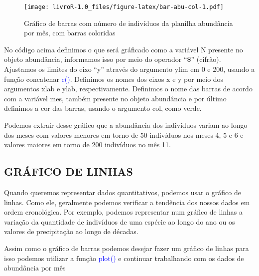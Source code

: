 \documentclass[titlepage, oneside, openany, a4paper]{book}
\newenvironment{Shaded}{\begin{snugshade}}{\end{snugshade}}
\newcommand{\DataTypeTok}[1]{\textcolor[rgb]{0.13,0.29,0.53}{#1}}
\newcommand{\DecValTok}[1]{\textcolor[rgb]{0.00,0.00,0.81}{#1}}
\newcommand{\KeywordTok}[1]{\textcolor[rgb]{0.13,0.29,0.53}{\textbf{#1}}}
\newcommand{\NormalTok}[1]{#1}
\newcommand{\OperatorTok}[1]{\textcolor[rgb]{0.81,0.36,0.00}{\textbf{#1}}}
\newcommand{\StringTok}[1]{\textcolor[rgb]{0.31,0.60,0.02}{#1}}
\begin{document}
\begin{Shaded}
\end{Shaded}

\begin{figure}
\centering
\texttt{[image: livroR-1.0\_files/figure-latex/bar-abu-col-1.pdf]}
\caption{\label{fig:bar-abu-col}Gráfico de barras com número de indivíduos da planilha abundância por mês, com barras coloridas}
\end{figure}

No código acima definimos o que será gráficado como a variável N presente no objeto abundância, informamos isso por meio do operador ``\textbf{\$}'' (cifrão). Ajustamos os limites do eixo ``y'' através do argumento ylim em 0 e 200, usando a função concatenar \textcolor{blue}{c()}. Definimos os nomes dos eixos x e y por meio dos argumentos xlab e ylab, respectivamente. Definimos o nome das barras de acordo com a variável mes, também presente no objeto abundância e por último definimos a cor das barras, usando o argumento col, como verde.

Podemos extrair desse gráfico que a abundância dos indivíduos variam ao longo dos meses com valores menores em torno de 50 indivíduos nos meses 4, 5 e 6 e valores maiores em torno de 200 indivíduos no mês 11.

\hypertarget{gruxe1fico-de-linhas}{%
\subsection{GRÁFICO DE LINHAS}\label{gruxe1fico-de-linhas}}

Quando queremos representar dados quantitativos, podemos usar o gráfico de linhas. Como ele, geralmente podemos verificar a tendência dos nossos dados em ordem cronológica. Por exemplo, podemos representar num gráfico de linhas a variação da quantidade de indivíduos de uma espécie ao longo do ano ou os valores de precipitação ao longo de décadas.

Assim como o gráfico de barras podemos desejar fazer um gráfico de linhas para isso podemos utilizar a função \textcolor{blue}{plot()} e continuar trabalhando com os dados de abundância por mês
\end{document}
